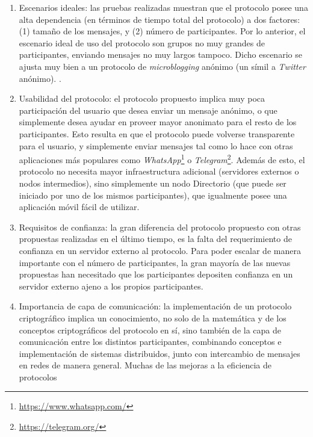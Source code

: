 \begin{enumerate}
    \item Escenarios ideales: las pruebas realizadas muestran que el protocolo posee una 
    alta dependencia (en términos de tiempo total del protocolo) a dos factores: 
    (1) tamaño de los mensajes, y (2) número de participantes. Por lo anterior, el escenario 
    ideal de uso del protocolo son grupos no muy grandes de participantes, enviando mensajes 
    no muy largos tampoco. Dicho escenario se ajusta muy bien a un protocolo de 
    \emph{microblogging} anónimo (un símil a \emph{Twitter} anónimo). .
    \item Usabilidad del protocolo: el protocolo propuesto implica muy poca participación 
    del usuario que desea enviar un mensaje anónimo, o que simplemente desea ayudar en proveer 
    mayor anonimato para el resto de los participantes. Esto resulta en que el protocolo 
    puede volverse transparente para el usuario, y simplemente enviar mensajes tal como lo hace 
    con otras aplicaciones más populares como 
    \emph{WhatsApp}\footnote{\url{https://www.whatsapp.com/}} o 
    \emph{Telegram}\footnote{\url{https://telegram.org/}}. 
    Además de esto, el protocolo no necesita mayor infraestructura adicional (servidores externos o 
    nodos intermedios), sino 
    simplemente un nodo Directorio (que puede ser iniciado por uno de los mismos participantes), 
    que igualmente posee una aplicación móvil fácil de utilizar.
    \item Requisitos de confianza: la gran diferencia del protocolo propuesto con 
    otras propuestas realizadas en el último tiempo, es la falta del requerimiento de 
    confianza en un servidor externo al protocolo. Para poder escalar de manera importante 
    con el número de participantes, la gran mayoría de las nuevas propuestas han necesitado 
    que los participantes depositen confianza en un servidor externo ajeno a los propios 
    participantes. 
    \item Importancia de capa de comunicación: la implementación de un protocolo criptográfico 
    implica un conocimiento, no solo de la matemática y de los conceptos criptográficos del 
    protocolo en sí, sino también de la capa de comunicación entre los distintos participantes, 
    combinando conceptos e implementación de sistemas distribuidos, junto con intercambio de 
    mensajes en redes de manera general. Muchas de las mejoras a la eficiencia de protocolos 

\end{enumerate}
